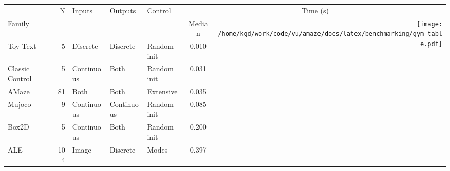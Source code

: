 \documentclass{standalone}
\begin{document}
\newlength{\img}%
\setlength{\img}{7.5\baselineskip}%
\begin{tabular}{lrlllc@{}r@{}}
\toprule
 & N & Inputs & Outputs & Control & \multicolumn{2}{c}{Time (s)} \\
\cmidrule(lr){6-7}
Family &   &        &         &         & Median & \multirow{8}{*}{\texttt{[image: /home/kgd/work/code/vu/amaze/docs/latex/benchmarking/gym\_table.pdf]}} \\
\cmidrule{1-6}
Toy Text & 5 & Discrete & Discrete & Random init & 0.010 \\
Classic Control & 5 & Continuous & Both & Random init & 0.031 \\
AMaze & 81 & Both & Both & Extensive & 0.035 \\
Mujoco & 9 & Continuous & Continuous & Random init & 0.085 \\
Box2D & 5 & Continuous & Both & Random init & 0.200 \\
ALE & 104 & Image & Discrete & Modes & 0.397 \\
\bottomrule
\end{tabular}
\end{document}

